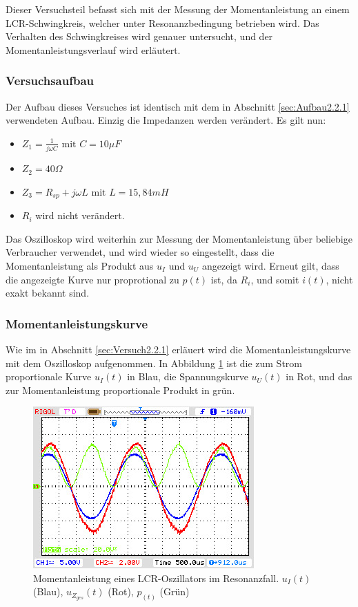 
Dieser Versuchsteil befasst sich mit der Messung der Momentanleistung an einem LCR-Schwingkreis, welcher unter Resonanzbedingung betrieben wird. Das Verhalten des Schwingkreises wird genauer untersucht, und der Momentanleistungsverlauf wird erläutert.

\subsubsection{Versuchsaufbau}
Der Aufbau dieses Versuches ist identisch mit dem in Abschnitt \ref{sec:Aufbau2.2.1} verwendeten Aufbau. Einzig die Impedanzen werden verändert. Es gilt nun:
\begin{itemize}
\item $Z_1 = \frac{1}{j\omega C} \mbox{ mit } C=10\mu F $
\item $Z_2 = 40\Omega$
\item $Z_3 = R_{sp} + j\omega L \mbox{ mit } L=15,84mH$
\item $R_i$ wird nicht verändert. 
\end{itemize}

Das Oszilloskop wird weiterhin zur Messung der Momentanleistung über beliebige Verbraucher verwendet, und wird wieder so eingestellt, dass die Momentanleistung als Produkt aus $u_I$ und $u_U$ angezeigt wird. Erneut gilt, dass die angezeigte Kurve nur proprotional zu $p(t)$ ist, da $R_i$, und somit $i(t)$, nicht exakt bekannt sind.

\subsubsection{Momentanleistungskurve}

Wie im in Abschnitt \ref{sec:Versuch2.2.1} erläuert wird die Momentanleistungskurve mit dem Oszilloskop aufgenommen. In Abbildung \ref{fig:MomLKurveResonanz} ist die zum Strom proportionale Kurve $u_I(t)$ in Blau, die Spannungskurve $u_U(t)$ in Rot, und das zur Momentanleistung proportionale Produkt in grün.

\begin{figure}[H]
\centering
\includegraphics[width=0.7\linewidth]{Oszi-Bitmaps/NewFile4.jpg}
\caption{Momentanleistung eines LCR-Oszillators im Resonanzfall. $u_I(t)$ (Blau), $u_{Z_{ges}}(t)$ (Rot), $p_(t)$ (Grün)}
\label{fig:MomLKurveResonanz}
\end{figure}

